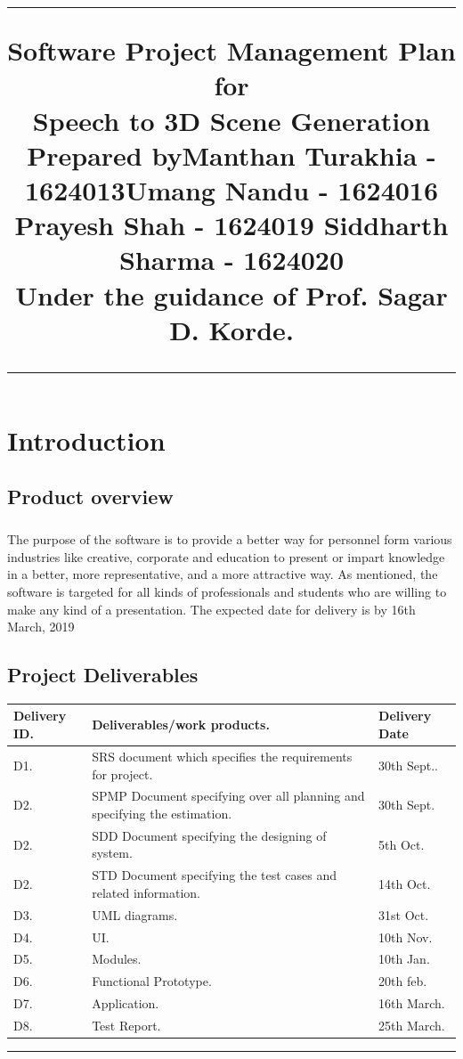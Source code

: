 \documentclass[12pt,a4paper,final,oneside]{report}
\title{%
\flushright
\rule{16cm}{5pt}\vskip1cm
\Huge{Software Project Management Plan}\\
\vspace{0.1cm}
for\\
\vspace{0.1cm}
Speech to 3D Scene Generation\\
\vspace{1cm}
Prepared by\linebreak Manthan Turakhia - 1624013\linebreak Umang Nandu - 1624016 \linebreak Prayesh Shah - 1624019 \linebreak Siddharth Sharma - 1624020\\
\vspace{0.5cm}
Under the guidance of \linebreak Prof. Sagar D. Korde.\\
\vfill
\rule{16cm}{5pt}
}
\date{}
\begin{document}
\maketitle
\tableofcontents
\chapter{Introduction}
\section{Product overview}
\paragraph{}The purpose of the software is to provide a better way for personnel form various industries like creative, corporate and education to present or impart knowledge in a better, more representative, and a more attractive way. As mentioned, the software is targeted for all kinds of professionals and students who are willing to make any kind of a presentation. The expected date for delivery is by 16th March, 2019

\section{Project Deliverables}
\begin{table}[h!]
  \centering

  \begin{tabular}{ |p{2.3cm}| p{6cm} | p{3cm} | }
\hline
    Delivery ID. & Deliverables/work products.& Delivery Date\\
    \hline
    D1. & SRS document which specifies the requirements for project.& 30th Sept..\\
 \hline
    D2. & SPMP Document specifying over all planning and specifying the estimation.& 30th Sept.\\
 \hline
  D2. & SDD Document specifying the designing of system.& 5th Oct.\\
 \hline
  D2. & STD Document specifying the test cases and related information.& 14th Oct.\\
 \hline
    D3. & UML diagrams.& 31st Oct.\\
 \hline
    D4. & UI.& 10th Nov.\\
 \hline
    D5. & Modules.& 10th Jan.\\
 \hline
    D6. &Functional Prototype.& 20th feb.\\
 \hline
   D7. &Application.& 16th March.\\
 \hline
   D8. &Test Report.& 25th March.\\
 \hline

  \end{tabular}
\end{table}
\rule{16cm}{5pt}
\end{document}
